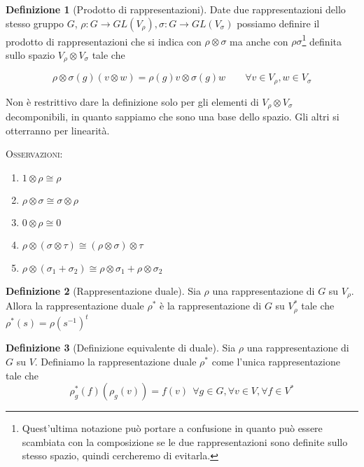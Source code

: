 \documentclass[11pt]{article}
\theoremstyle{plain}
\theoremstyle{definition}
\newtheorem{defn}{Definizione}[section]
\theoremstyle{remark}
\begin{document}
\begin{defn}[Prodotto di rappresentazioni]
  Date due rappresentazioni dello stesso gruppo $G$, $\rho: G \to GL(V_\rho), \sigma: G \to GL(V_\sigma)$ possiamo definire il prodotto di rappresentazioni che si indica con $\rho \otimes \sigma$  ma anche con $\rho\sigma$\footnote{Quest'ultima notazione può portare a confusione in quanto può essere scambiata con la composizione se le due rappresentazioni sono definite sullo stesso spazio, quindi cercheremo di evitarla.} definita sullo spazio $V_\rho \otimes V_\sigma$ tale che

  \[ \rho \otimes \sigma(g) (v \otimes w) = \rho(g) v \otimes \sigma(g) w \qquad \forall v \in V_\rho, w \in V_\sigma\]

  Non è restrittivo dare la definizione solo per gli elementi di $V_\rho \otimes V_\sigma$ decomponibili, in quanto sappiamo che sono una base dello spazio. Gli altri si otterranno per linearità.

\label{defn:prodotto di rappresentazioni}
\end{defn}


\textsc{Osservazioni:}


\begin{enumerate}
\item $1\otimes \rho \cong \rho$
\item $\rho \otimes \sigma \cong \sigma \otimes \rho$
\item $0 \otimes \rho \cong 0$
\item $\rho \otimes (\sigma \otimes \tau) \cong (\rho \otimes \sigma)\otimes \tau$
\item $\rho \otimes (\sigma_1 + \sigma_2) \cong \rho \otimes \sigma_1 + \rho \otimes \sigma_2$

\end{enumerate}





\begin{defn}[Rappresentazione duale]
Sia $\rho$ una rappresentazione di $G$ su $V_\rho$. Allora la rappresentazione duale $\rho^*$ è la rappresentazione di $G$ su $V_\rho ^*$ tale che $\rho^*(s)=\rho(s^{-1})^t$
\label{defn:rappresentazione duale}
\end{defn}

\begin{defn}[Definizione equivalente di duale]
Sia $\rho$ una rappresentazione di $G$ su $V$. Definiamo la rappresentazione duale $\rho^*$ come l'unica rappresentazione tale che
\[\rho_g^*(f)(\rho_g(v))=f(v)\ \ \forall g\in G,\forall v\in V,\forall f\in V^*\]
\end{defn}
\end{document}
